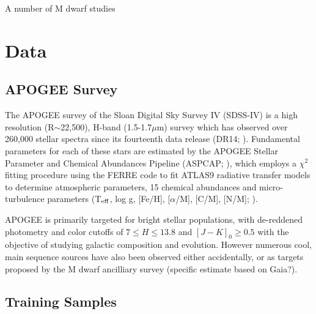 \documentclass[modern]{aastex62}
\begin{document}
A number of M dwarf studies


\section{Data} \label{sec:data}

\subsection{APOGEE Survey}


The APOGEE survey \citep{Majewski:2015} of the Sloan Digital Sky Survey IV (SDSS-IV) is a high resolution (R$\sim$22,500), H-band (1.5-1.7$\mu$m) survey which has observed over 260,000 stellar spectra since its fourteenth data release (DR14; \citealt{Abolfathi:2017}). Fundamental parameters for each of these stars are estimated by the APOGEE Stellar Parameter and Chemical Abundances Pipeline (ASPCAP; \citealt{Perez:2016}), which employs a $\chi^2$ fitting procedure using the FERRE code to fit ATLAS9 radiative transfer models \citep{Castelli:2004} to determine atmospheric parameters, 15 chemical abundances and micro-turbulence parameters (T$_{\rm eff}$, log g, [Fe/H], [$\alpha$/M], [C/M], [N/M]; \citealt{Meszaros:2012}). 

APOGEE is primarily targeted for bright stellar populations, with de-reddened photometry and color cutoffs of $7 \leq H \leq 13.8$ and $[J-K]_0 \geq 0.5$ \citep{Zasowski:2013} with the objective of studying galactic composition and evolution. However numerous cool, main sequence sources have also been observed either accidentally, or as targets proposed by the M dwarf ancilliary survey \citep{Desphande:2013} (specific estimate based on Gaia?).


\subsection{Training Samples}
\end{document}
